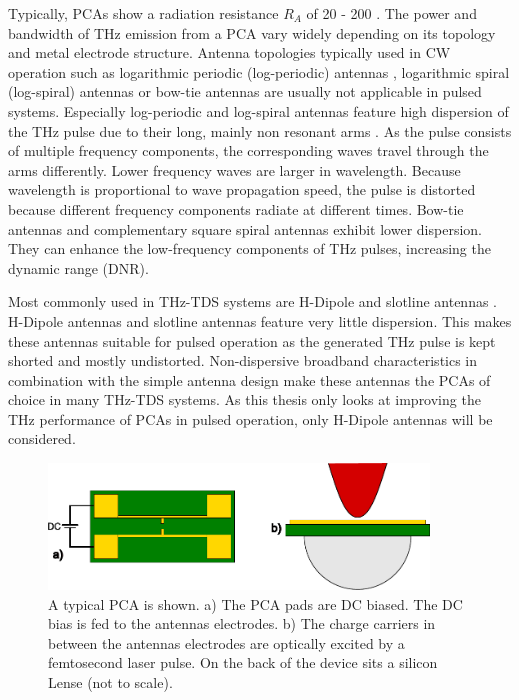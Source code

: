 Typically, PCAs show a radiation resistance $R_A$ of \num{20} - \num{200} \si{\Omega}. The power and bandwidth of THz emission from a PCA vary widely depending on its topology and metal electrode structure. Antenna topologies typically used in CW operation such as logarithmic periodic (log-periodic) antennas \cite{mendisTunableCWTHzSystem2004}, logarithmic spiral (log-spiral) \cite{linRoomtemperatureContinuouswaveTerahertz2025} antennas or bow-tie antennas \cite{PDFBowtieWideband} are usually not applicable in pulsed systems. Especially log-periodic and log-spiral antennas feature high dispersion of the THz pulse due to their long, mainly non resonant arms \cite{fernandezolveraDispersivePropertiesSelfcomplementary2017a}. As the pulse consists of multiple frequency components, the corresponding waves travel through the arms differently. Lower frequency waves are larger in wavelength. Because wavelength is proportional to wave propagation speed, the pulse is distorted because different frequency components radiate at different times. Bow-tie antennas and complementary square spiral antennas \cite{HighPowerGeneration} exhibit lower dispersion. They can enhance the low-frequency components of THz pulses, increasing the dynamic range (DNR). 

Most commonly used in THz-TDS systems are H-Dipole \cite{nandi1550nmDrivenErAs2018} and slotline antennas \cite{kohlhaasPhotoconductiveTerahertzDetectors2019}. H-Dipole antennas and slotline antennas feature very little dispersion. This makes these antennas suitable for pulsed operation as the generated THz pulse is kept shorted and mostly undistorted. Non-dispersive broadband characteristics in combination with the simple antenna design make these antennas the PCAs of choice in many THz-TDS systems. As this thesis only looks at improving the THz performance of PCAs in pulsed operation, only H-Dipole antennas will be considered. 

\begin{figure}
	\centering
	\includegraphics[width=0.9\textwidth]{figures/typical_PCA.pdf}
	\caption{A typical PCA is shown. a) The PCA pads are DC biased. The DC bias is fed to the antennas electrodes. b) The charge carriers in between the antennas electrodes are optically excited by a femtosecond laser pulse. On the back of the device sits a silicon Lense (not to scale).}
	\label{typPCA}
\end{figure}

